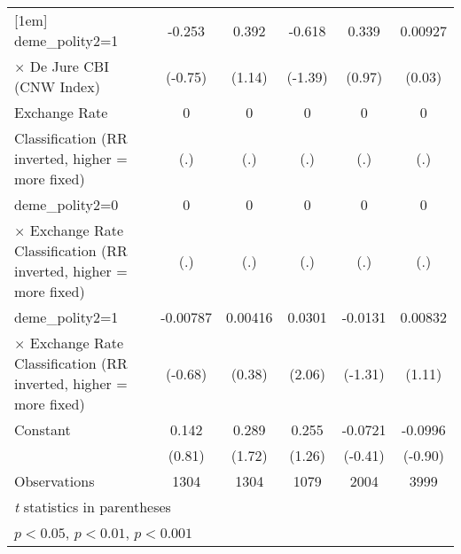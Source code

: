 {\begin{tabular}{l*{5}{c}}
[1em]
deme\_polity2=1      &      -0.253         &       0.392         &      -0.618         &       0.339         &     0.00927         \\
$\times$ De Jure CBI (CNW Index)&     (-0.75)         &      (1.14)         &     (-1.39)         &      (0.97)         &      (0.03)         \\
[1em]
Exchange Rate       &           0         &           0         &           0         &           0         &           0         \\
Classification (RR inverted, higher = more fixed)&         (.)         &         (.)         &         (.)         &         (.)         &         (.)         \\
[1em]
deme\_polity2=0      &           0         &           0         &           0         &           0         &           0         \\
$\times$ Exchange Rate Classification (RR inverted, higher = more fixed)&         (.)         &         (.)         &         (.)         &         (.)         &         (.)         \\
[1em]
deme\_polity2=1      &    -0.00787         &     0.00416         &      0.0301\sym{*}  &     -0.0131         &     0.00832         \\
$\times$ Exchange Rate Classification (RR inverted, higher = more fixed)&     (-0.68)         &      (0.38)         &      (2.06)         &     (-1.31)         &      (1.11)         \\
[1em]
Constant            &       0.142         &       0.289         &       0.255         &     -0.0721         &     -0.0996         \\
                    &      (0.81)         &      (1.72)         &      (1.26)         &     (-0.41)         &     (-0.90)         \\
\hline
Observations        &        1304         &        1304         &        1079         &        2004         &        3999         \\
\hline\hline
\multicolumn{6}{l}{\footnotesize \textit{t} statistics in parentheses}\\
\multicolumn{6}{l}{\footnotesize \sym{*} \(p<0.05\), \sym{**} \(p<0.01\), \sym{***} \(p<0.001\)}\\
\end{tabular}
}
